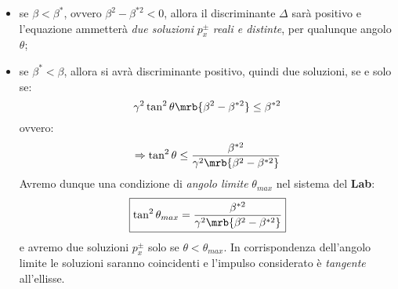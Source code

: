 \begin{itemize}
	\item se $\beta < \beta^\ast$, ovvero $\beta^2 - \beta^{\ast2} < 0$, allora il
	      discriminante $\Delta$ sarà positivo e l'equazione ammetterà \textit{due
		      soluzioni} $p_x^\pm$ \textit{reali e distinte}, per qualunque angolo
	      $\theta$;
	\item se $\beta^\ast < \beta$, allora si avrà discriminante positivo, quindi due
	      soluzioni, se e solo se:
	      \begin{equation}
		      \gamma^2 \tan^2 \theta \mrb{\beta^2 - \beta^{\ast2}} \leq \beta^{\ast2}
	      \end{equation}
	      ovvero:
	      \begin{equation}
		      \Rightarrow \tan^2 \theta \leq \frac{\beta^{\ast2}}{\gamma^2 \mrb{\beta^2
				      - \beta^{\ast2}}}
	      \end{equation}
	      Avremo dunque una condizione di \textit{angolo limite} $\theta_{max}$ nel
	      sistema del \textbf{Lab}:
	      \begin{equation}
		      \boxed{
			      \tan^2 \theta_{max}
			      = \frac{\beta^{\ast2}}{\gamma^2 \mrb{\beta^2 - \beta^{\ast 2}}}
		      }
	      \end{equation}
	      e avremo due soluzioni $p_x^\pm$ solo se $\theta < \theta_{max}$. In
	      corrispondenza dell'angolo limite le soluzioni saranno coincidenti e
	      l'impulso considerato è \textit{tangente} all'ellisse.
\end{itemize}


